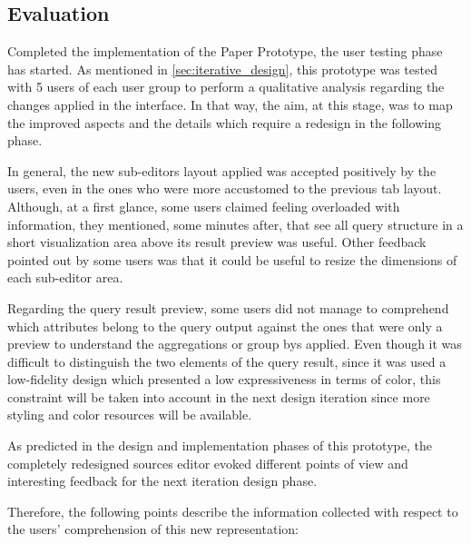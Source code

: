 
\subsection{Evaluation}
\label{subsec:paper_prototype_evaluation}

Completed the implementation of the Paper Prototype, the user testing phase has started. As mentioned in \ref{sec:iterative_design}, this prototype was tested with 5 users of each user group to perform a qualitative analysis regarding the changes applied in the interface. In that way, the aim, at this stage, was to map the improved aspects  and the details which require a redesign in the following phase.

In general, the new sub-editors layout applied was accepted positively by the users, even in the ones who were more accustomed to the previous tab layout. Although, at a first glance, some users claimed feeling overloaded with information, they mentioned, some minutes after, that see all query structure in a short visualization area above its result preview was useful. Other feedback pointed out by some users was that it could be useful to resize the dimensions of each sub-editor area.

Regarding the query result preview, some users did not manage to comprehend which attributes belong to the query output against the ones that were only a preview to understand the aggregations or group bys applied. Even though it was difficult to distinguish the two elements of the query result, since it was used a low-fidelity design which presented a low expressiveness in terms of color, this constraint will be taken into account in the next design iteration since more styling and color resources will be available.

As predicted in the design and implementation phases of this prototype, the completely redesigned sources editor evoked different points of view and interesting feedback for the next iteration design phase.

Therefore, the following points describe the information collected with respect to the users' comprehension of this new representation:

